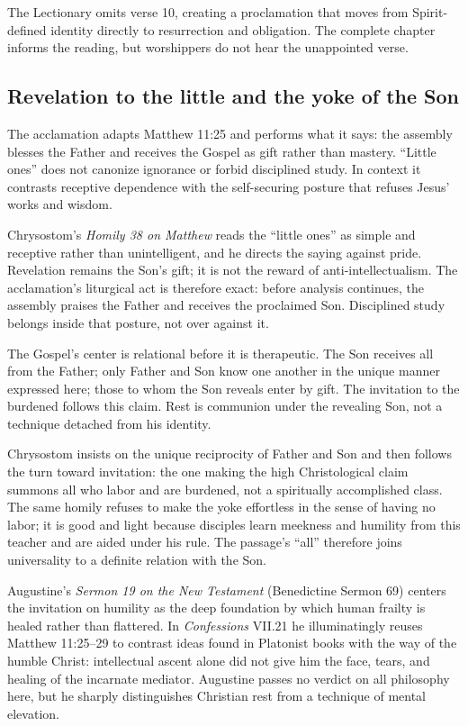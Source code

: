 The Lectionary omits verse 10, creating a proclamation that moves from Spirit-defined identity directly to resurrection and obligation. The complete chapter informs the reading, but worshippers do not hear the unappointed verse.

\subsection*{Revelation to the little and the yoke of the Son\enspace{}}

The acclamation adapts Matthew 11:25 and performs what it says: the assembly blesses the Father and receives the Gospel as gift rather than mastery. “Little ones” does not canonize ignorance or forbid disciplined study. In context it contrasts receptive dependence with the self-securing posture that refuses Jesus' works and wisdom.

Chrysostom's \emph{Homily 38 on Matthew} reads the “little ones” as simple and receptive rather than unintelligent, and he directs the saying against pride. Revelation remains the Son's gift; it is not the reward of anti-intellectualism. The acclamation's liturgical act is therefore exact: before analysis continues, the assembly praises the Father and receives the proclaimed Son. Disciplined study belongs inside that posture, not over against it.

The Gospel's center is relational before it is therapeutic. The Son receives all from the Father; only Father and Son know one another in the unique manner expressed here; those to whom the Son reveals enter by gift. The invitation to the burdened follows this claim. Rest is communion under the revealing Son, not a technique detached from his identity.

Chrysostom insists on the unique reciprocity of Father and Son and then follows the turn toward invitation: the one making the high Christological claim summons all who labor and are burdened, not a spiritually accomplished class. The same homily refuses to make the yoke effortless in the sense of having no labor; it is good and light because disciples learn meekness and humility from this teacher and are aided under his rule. The passage's “all” therefore joins universality to a definite relation with the Son.

Augustine's \emph{Sermon 19 on the New Testament} (Benedictine Sermon 69) centers the invitation on humility as the deep foundation by which human frailty is healed rather than flattered. In \emph{Confessions} VII.21 he illuminatingly reuses Matthew 11:25--29 to contrast ideas found in Platonist books with the way of the humble Christ: intellectual ascent alone did not give him the face, tears, and healing of the incarnate mediator. Augustine passes no verdict on all philosophy here, but he sharply distinguishes Christian rest from a technique of mental elevation.

